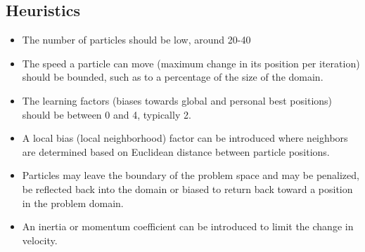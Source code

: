 \subsection{Heuristics}
\begin{itemize}
	\item The number of particles should be low, around 20-40
	\item The speed a particle can move (maximum change in its position per iteration) should be bounded, such as to a percentage of the size of the domain.
	\item The learning factors (biases towards global and personal best positions) should be between 0 and 4, typically 2.
	\item A local bias (local neighborhood) factor can be introduced where neighbors are determined based on Euclidean distance between particle positions.
	\item Particles may leave the boundary of the problem space and may be penalized, be reflected back into the domain or biased to return back toward a position in the problem domain. 
	\item An inertia or momentum coefficient can be introduced to limit the change in velocity.
\end{itemize}

